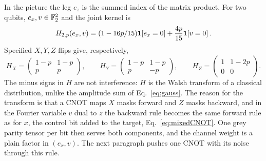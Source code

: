 In the picture the leg $e_z$ is the summed index of the matrix product. 
For two qubits, $e_x,v\in\mathbb F_2^2$ and the joint kernel is
\begin{equation}
 H_{2,p}(e_x,v)=(1-16p/15)\mathbf1\!\left[e_x=0\right]+\frac{4p}{15}\mathbf1\!\left[v=0\right] .
 \label{eq:depol2}
\end{equation}
Specified $X,Y,Z$ flips give, respectively,
\begin{equation}
 H_X=\begin{pmatrix}1-p&1-p\\p&p\end{pmatrix},\qquad
 H_Y=\begin{pmatrix}1-p&1-p\\p&-p\end{pmatrix},\qquad
 H_Z=\begin{pmatrix}1&1-2p\\0&0\end{pmatrix}.
 \label{eq:flipkernels}
\end{equation}
The minus signs in $H$ are not interference: $H$ is the Walsh transform of a classical distribution, unlike the amplitude sum of Eq.~\eqref{eq:gauss}. The reason for the transform is that a CNOT maps $X$ masks forward and $Z$ masks backward, and in the Fourier variable $v$ dual to $z$ the backward rule becomes the same forward rule as for $x$, the control bit added to the target, Eq.~\eqref{eq:mixedCNOT}. One grey parity tensor per bit then serves both components, and the channel weight is a plain factor in $(e_x,v)$. The next paragraph pushes one CNOT with its noise through this rule.

